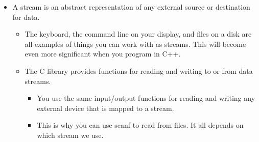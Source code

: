\begin{itemize}
    \item A stream is an abstract representation of any external source or destination for data.
        \begin{itemize}
            \item The keyboard, the command line on your display, and files on a disk are all examples of things you can work with as streams. This will become even more significant when you program in C++.
            \item The C library provides functions for reading and writing to or from data streams.
                \begin{itemize}
                    \item You use the same input/output functions for reading and writing any external device that is mapped to a stream.
                    \item This is why you can use scanf to read from files. It all depends on which stream we use.
                \end{itemize}
        \end{itemize}
\end{itemize}


